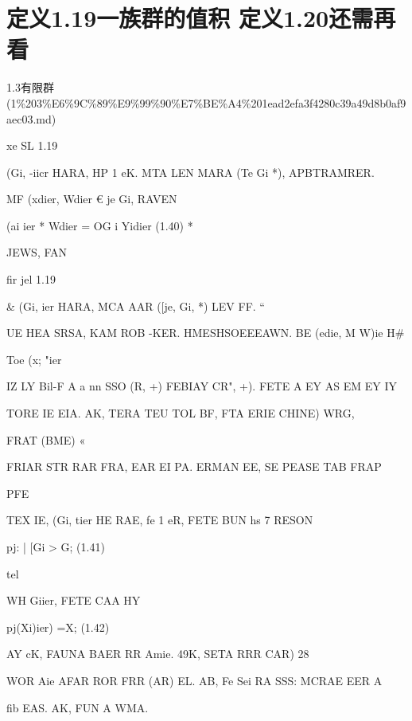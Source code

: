 \section*{定义1.19一族群的值积 定义1.20还需再看}

\begin{note}[来源上级主题]

1.3有限群 (1\%203\%E6\%9C\%89\%E9\%99\%90\%E7\%BE\%A4\%201ead2efa3f4280c39a49d8b0af9aec03.md)

\end{note}

\begin{definition}

xe SL 1.19

(Gi, -iicr HARA, HP 1 eK. MTA LEN MARA (Te Gi *), APBTRAMRER.

MF (xdier, Wdier € je Gi, RAVEN

(ai ier * Wdier = OG i Yidier                                     (1.40)  *

JEWS, FAN

fir jel 1.19

\& (Gi, ier HARA, MCA AAR ([je, Gi, *) LEV FF.                                              “

UE HEA SRSA, KAM ROB -KER. HMESHSOEEEAWN. BE (edie, M W)ie H\#

Toe (x; "ier

IZ LY Bil-F A a nn SSO (R, +) FEBIAY CR", +). FETE A EY AS EM EY IY

TORE IE EIA. AK, TERA TEU TOL BF, FTA ERIE CHINE) WRG,

FRAT (BME) «

FRIAR STR RAR FRA, EAR EI PA. ERMAN EE, SE PEASE TAB FRAP

PFE

TEX IE, (Gi, tier HE RAE, fe 1 eR, FETE BUN hs 7 RESON

pj: | [Gi > G;                           (1.41)

tel

WH Giier, FETE CAA HY

pj(Xi)ier) =X;                                                (1.42)

AY cK, FAUNA BAER RR Amie. 49K, SETA RRR CAR) 28

WOR Aie AFAR ROR FRR (AR) EL. AB, Fe Sei RA SSS: MCRAE EER A

fib EAS. AK, FUN A WMA.

\end{definition}

